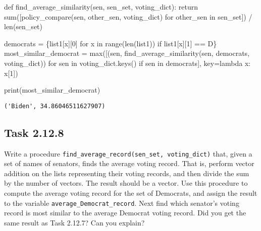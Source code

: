 \documentclass[
  letterpaper,
  DIV=11,
  numbers=noendperiod]{scrartcl}
\newenvironment{Shaded}{\begin{snugshade}}{\end{snugshade}}
\newcommand{\BuiltInTok}[1]{\textcolor[rgb]{0.00,0.23,0.31}{#1}}
\newcommand{\ControlFlowTok}[1]{\textcolor[rgb]{0.00,0.23,0.31}{#1}}
\newcommand{\DecValTok}[1]{\textcolor[rgb]{0.68,0.00,0.00}{#1}}
\newcommand{\KeywordTok}[1]{\textcolor[rgb]{0.00,0.23,0.31}{#1}}
\newcommand{\NormalTok}[1]{\textcolor[rgb]{0.00,0.23,0.31}{#1}}
\newcommand{\OperatorTok}[1]{\textcolor[rgb]{0.37,0.37,0.37}{#1}}
\newcommand{\StringTok}[1]{\textcolor[rgb]{0.13,0.47,0.30}{#1}}
\begin{document}
\begin{Shaded}
\begin{Highlighting}[numbers=left,,]
\KeywordTok{def}\NormalTok{ find\_average\_similarity(sen, sen\_set, voting\_dict): }\ControlFlowTok{return} \BuiltInTok{sum}\NormalTok{([policy\_compare(sen, other\_sen, voting\_dict) }\ControlFlowTok{for}\NormalTok{ other\_sen }\KeywordTok{in}\NormalTok{ sen\_set]) }\OperatorTok{/} \BuiltInTok{len}\NormalTok{(sen\_set)}

\NormalTok{democrats }\OperatorTok{=}\NormalTok{ \{list1[x][}\DecValTok{0}\NormalTok{] }\ControlFlowTok{for}\NormalTok{ x }\KeywordTok{in} \BuiltInTok{range}\NormalTok{(}\BuiltInTok{len}\NormalTok{(list1)) }\ControlFlowTok{if}\NormalTok{ list1[x][}\DecValTok{1}\NormalTok{] }\OperatorTok{==} \StringTok{\textquotesingle{}D\textquotesingle{}}\NormalTok{\}}
\NormalTok{most\_similar\_democrat }\OperatorTok{=} \BuiltInTok{max}\NormalTok{([(sen, find\_average\_similarity(sen, democrats, voting\_dict)) }\ControlFlowTok{for}\NormalTok{ sen }\KeywordTok{in}\NormalTok{ voting\_dict.keys() }\ControlFlowTok{if}\NormalTok{ sen }\KeywordTok{in}\NormalTok{ democrats], key}\OperatorTok{=}\KeywordTok{lambda}\NormalTok{ x: x[}\DecValTok{1}\NormalTok{])}

\BuiltInTok{print}\NormalTok{(most\_similar\_democrat)}
\end{Highlighting}
\end{Shaded}

\begin{verbatim}
('Biden', 34.86046511627907)
\end{verbatim}

\hypertarget{task-2.12.8}{%
\subsection{Task 2.12.8}\label{task-2.12.8}}

Write a procedure
\texttt{find\_average\_record(sen\_set,\ voting\_dict)} that, given a
set of names of senators, finds the average voting record. That is,
perform vector addition on the lists representing their voting records,
and then divide the sum by the number of vectors. The result should be a
vector. Use this procedure to compute the average voting record for the
set of Democrats, and assign the result to the variable
\texttt{average\_Democrat\_record}. Next find which senator's voting
record is most similar to the average Democrat voting record. Did you
get the same result as Task 2.12.7? Can you explain?
\end{document}
